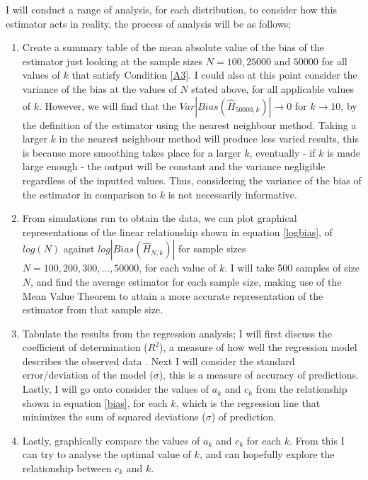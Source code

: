 \documentclass[12pt]{report}
\begin{document}
I will conduct a range of analysis, for each distribution, to consider how this estimator acts in reality, the process of analysis will be as follows;
\begin{enumerate}
\item Create a summary table of the mean absolute value of the bias of the estimator just looking at the sample sizes $N=100, 25000$ and $50000$ for all values of $k$ that satisfy Condition \ref{A3}. I could also at this point consider the variance of the bias at the values of $N$ stated above, for all applicable values of $k$. However, we will find that the $Var|Bias(\hat{H}_{50000, k})| \to 0$ for $k \to 10$, by the definition of the estimator using the nearest neighbour method. Taking a larger $k$ in the nearest neighbour method will produce less varied results, this is because more smoothing takes place for a larger $k$, eventually - if $k$ is made large enough - the output will be constant and the variance negligible regardless of the inputted values. Thus, considering the variance of the bias of the estimator in comparison to $k$ is not necessarily informative. 

\item From simulations run to obtain the data, we can plot graphical representations of the linear relationship shown in equation \ref{logbias}, of $log(N)$ against $log|Bias(\hat{H}_{N, k})|$ for sample sizes $N=100, 200, 300, ..., 50000$, for each value of $k$. I will take 500 samples of size $N$, and find the average estimator for each sample size, making use of the Mean Value Theorem to attain a more accurate representation of the estimator from that sample size.

\item Tabulate the results from the regression analysis; I will first discuss the coefficient of determination ($R^2$), a measure of how well the regression model describes the observed data \cite{regression1}. Next I will consider the standard error/deviation of the model ($\sigma$), this is a measure of accuracy of predictions. Lastly, I will go onto consider the values of $a_{k}$ and $c_{k}$ from the relationship shown in equation \ref{bias}, for each $k$, which is the regression line that minimizes the sum of squared deviations ($\sigma$) of prediction.

\item Lastly, graphically compare the values of $a_{k}$ and $c_{k}$ for each $k$. From this I can try to analyse the optimal value of $k$, and can hopefully explore the relationship between $c_{k}$ and $k$.

\end{enumerate}
\end{document}

